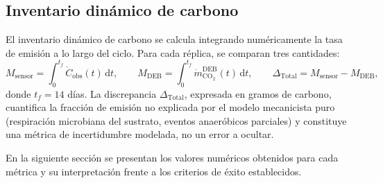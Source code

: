\subsection{Inventario dinámico de carbono}
\label{subsec:cap5_inventario}

El inventario dinámico de carbono se calcula integrando numéricamente la tasa de emisión a lo largo del ciclo. Para cada réplica, se comparan tres cantidades:
\begin{equation}
M_{\mathrm{sensor}} = \int_{0}^{t_f} \dot{C}_{\mathrm{obs}}(t)\,\mathrm{d}t, \qquad
M_{\mathrm{DEB}} = \int_{0}^{t_f} \dot{m}_{\mathrm{CO_2}}^{\mathrm{DEB}}(t)\,\mathrm{d}t, \qquad
\Delta_{\mathrm{Total}} = M_{\mathrm{sensor}} - M_{\mathrm{DEB}},
\label{eq:inventario_carbono}
\end{equation}
donde $t_f = 14$ días. La discrepancia $\Delta_{\mathrm{Total}}$, expresada en gramos de carbono, cuantifica la fracción de emisión no explicada por el modelo mecanicista puro (respiración microbiana del sustrato, eventos anaeróbicos parciales) y constituye una métrica de incertidumbre modelada, no un error a ocultar.

En la siguiente sección se presentan los valores numéricos obtenidos para cada métrica y su interpretación frente a los criterios de éxito establecidos.
